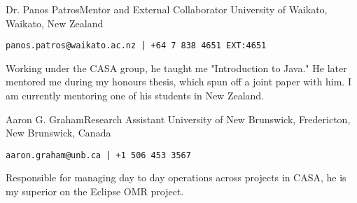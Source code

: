 \documentclass{developercv} %
\begin{document}
\entrys%
{Dr. Panos Patros}{Mentor and External Collaborator}
{University of Waikato, Waikato, New Zealand}
{\texttt{panos.patros@waikato.ac.nz | +64 7 838 4651 EXT:4651}

	Working under the CASA group, he taught me "Introduction to Java."
	He later mentored me during my honours thesis, which spun off a joint paper with him.
	I am currently mentoring one of his students in New Zealand.
}

\entrys%
{Aaron G. Graham}{Research Assistant}
{University of New Brunswick, Fredericton, New Brunswick, Canada}
{\texttt{aaron.graham@unb.ca | +1 506 453 3567}

	Responsible for managing day to day operations across projects in CASA, he is my superior on the Eclipse OMR project.
}

\ifdefined{}\fi
\end{document}
